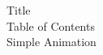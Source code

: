 \documentclass[preview]{standalone}
\begin{document}
Title\\Table of Contents\\Simple Animation\\
\end{document}
